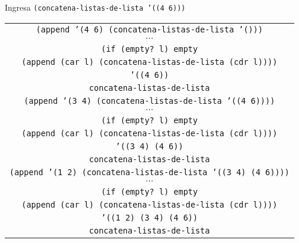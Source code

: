 \documentclass[letterpaper,11pt]{article}
\begin{document}
\begin{enumerate}
\begin{enumerate}
        Ingresa \texttt{(concatena-listas-de-lista '((4 6)))}
        \begin{center}
            \begin{tabular}{|c|}
                \hline
                \texttt{(append '(4 6) (concatena-listas-de-lista '()))} \\
                $\cdots$ \\
                \texttt{(if (empty? l) empty} \\
                \texttt{(append (car l) (concatena-listas-de-lista (cdr l))))} \\
                \texttt{'((4 6))} \\
                \texttt{concatena-listas-de-lista} \\
                \hline
                \hline
                \texttt{(append '(3 4) 
                (concatena-listas-de-lista '((4 6))))}  \\
                $\cdots$ \\
                \texttt{(if (empty? l) empty} \\
                \texttt{(append (car l) (concatena-listas-de-lista (cdr l))))} \\
                \texttt{'((3 4) (4 6))} \\
                \texttt{concatena-listas-de-lista} \\
                \hline
                \hline
                \texttt{(append '(1 2) 
                (concatena-listas-de-lista '((3 4) (4 6))))}  \\
                $\cdots$ \\
                \texttt{(if (empty? l) empty} \\
                \texttt{(append (car l) (concatena-listas-de-lista (cdr l))))} \\
                \texttt{'((1 2) (3 4) (4 6))} \\
                \texttt{concatena-listas-de-lista} \\
                \hline
            \end{tabular}
        \end{center}


\end{enumerate}
\end{enumerate}
\end{document}
